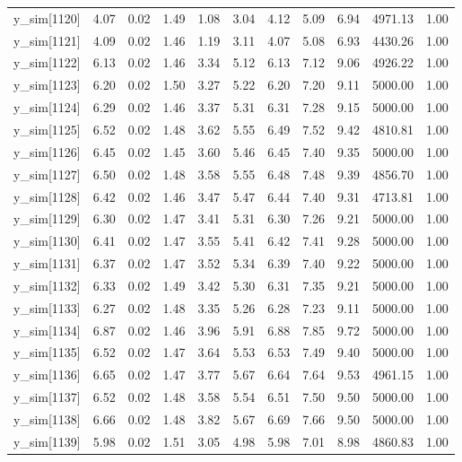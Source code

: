 \begin{table}[ht]
\begin{tabular}{rrrrrrrrrrr}
  y\_sim[1120] & 4.07 & 0.02 & 1.49 & 1.08 & 3.04 & 4.12 & 5.09 & 6.94 & 4971.13 & 1.00 \\ 
  y\_sim[1121] & 4.09 & 0.02 & 1.46 & 1.19 & 3.11 & 4.07 & 5.08 & 6.93 & 4430.26 & 1.00 \\ 
  y\_sim[1122] & 6.13 & 0.02 & 1.46 & 3.34 & 5.12 & 6.13 & 7.12 & 9.06 & 4926.22 & 1.00 \\ 
  y\_sim[1123] & 6.20 & 0.02 & 1.50 & 3.27 & 5.22 & 6.20 & 7.20 & 9.11 & 5000.00 & 1.00 \\ 
  y\_sim[1124] & 6.29 & 0.02 & 1.46 & 3.37 & 5.31 & 6.31 & 7.28 & 9.15 & 5000.00 & 1.00 \\ 
  y\_sim[1125] & 6.52 & 0.02 & 1.48 & 3.62 & 5.55 & 6.49 & 7.52 & 9.42 & 4810.81 & 1.00 \\ 
  y\_sim[1126] & 6.45 & 0.02 & 1.45 & 3.60 & 5.46 & 6.45 & 7.40 & 9.35 & 5000.00 & 1.00 \\ 
  y\_sim[1127] & 6.50 & 0.02 & 1.48 & 3.58 & 5.55 & 6.48 & 7.48 & 9.39 & 4856.70 & 1.00 \\ 
  y\_sim[1128] & 6.42 & 0.02 & 1.46 & 3.47 & 5.47 & 6.44 & 7.40 & 9.31 & 4713.81 & 1.00 \\ 
  y\_sim[1129] & 6.30 & 0.02 & 1.47 & 3.41 & 5.31 & 6.30 & 7.26 & 9.21 & 5000.00 & 1.00 \\ 
  y\_sim[1130] & 6.41 & 0.02 & 1.47 & 3.55 & 5.41 & 6.42 & 7.41 & 9.28 & 5000.00 & 1.00 \\ 
  y\_sim[1131] & 6.37 & 0.02 & 1.47 & 3.52 & 5.34 & 6.39 & 7.40 & 9.22 & 5000.00 & 1.00 \\ 
  y\_sim[1132] & 6.33 & 0.02 & 1.49 & 3.42 & 5.30 & 6.31 & 7.35 & 9.21 & 5000.00 & 1.00 \\ 
  y\_sim[1133] & 6.27 & 0.02 & 1.48 & 3.35 & 5.26 & 6.28 & 7.23 & 9.11 & 5000.00 & 1.00 \\ 
  y\_sim[1134] & 6.87 & 0.02 & 1.46 & 3.96 & 5.91 & 6.88 & 7.85 & 9.72 & 5000.00 & 1.00 \\ 
  y\_sim[1135] & 6.52 & 0.02 & 1.47 & 3.64 & 5.53 & 6.53 & 7.49 & 9.40 & 5000.00 & 1.00 \\ 
  y\_sim[1136] & 6.65 & 0.02 & 1.47 & 3.77 & 5.67 & 6.64 & 7.64 & 9.53 & 4961.15 & 1.00 \\ 
  y\_sim[1137] & 6.52 & 0.02 & 1.48 & 3.58 & 5.54 & 6.51 & 7.50 & 9.50 & 5000.00 & 1.00 \\ 
  y\_sim[1138] & 6.66 & 0.02 & 1.48 & 3.82 & 5.67 & 6.69 & 7.66 & 9.50 & 5000.00 & 1.00 \\ 
  y\_sim[1139] & 5.98 & 0.02 & 1.51 & 3.05 & 4.98 & 5.98 & 7.01 & 8.98 & 4860.83 & 1.00 \\ 

\end{tabular}
\end{table}
